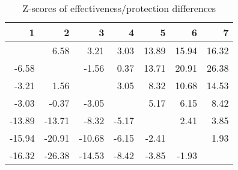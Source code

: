 \begin{table}[ht]
\centering
\begin{tabular}{rrrrrrr}
  \hline
1 & 2 & 3 & 4 & 5 & 6 & 7 \\ 
  \hline
 & 6.58 & 3.21 & 3.03 & 13.89 & 15.94 & 16.32 \\ 
  -6.58 &  & -1.56 & 0.37 & 13.71 & 20.91 & 26.38 \\ 
  -3.21 & 1.56 &  & 3.05 & 8.32 & 10.68 & 14.53 \\ 
  -3.03 & -0.37 & -3.05 &  & 5.17 & 6.15 & 8.42 \\ 
  -13.89 & -13.71 & -8.32 & -5.17 &  & 2.41 & 3.85 \\ 
  -15.94 & -20.91 & -10.68 & -6.15 & -2.41 &  & 1.93 \\ 
  -16.32 & -26.38 & -14.53 & -8.42 & -3.85 & -1.93 &  \\ 
   \hline
\end{tabular}
\caption{Z-scores of effectiveness/protection differences} 
\end{table}
